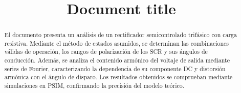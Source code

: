 \documentclass[conference]{IEEEtran}
\begin{document}
%
\title{Document title}

\author{
\and
{}
\and
{}
}


\maketitle

\thispagestyle{firststyle}
\renewcommand{\headrulewidth}{0in}
\pagestyle{empty}


\pagestyle{fancy}
\chead{\fontsize{8}{10} \selectfont \textit{} }



\begin{abstract}
El documento presenta un análisis de un rectificador semicontrolado trifásico con carga resistiva. Mediante el método de estados asumidos, se determinan las combinaciones válidas de operación,
los rangos de polarización de los SCR y sus ángulos de conducción. Además, se analiza el contenido armónico del voltaje de salida mediante series de Fourier, caracterizando la dependencia de su
componente DC y distorsión armónica con el ángulo de disparo. Los resultados obtenidos se comprueban mediante simulaciones en PSIM, confirmando la precisión del modelo teórico.
\end{abstract}
\end{document}
